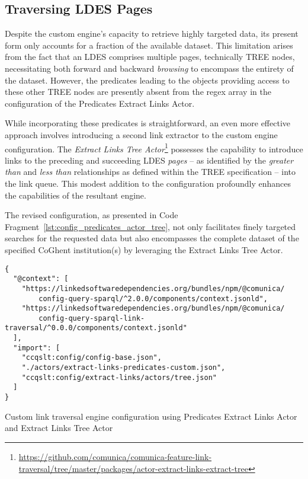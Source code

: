 \subsection{Traversing LDES Pages}

Despite the custom engine's capacity to retrieve highly targeted data, its present form only accounts for a fraction of the available dataset. This limitation arises from the fact that an LDES comprises multiple pages, technically TREE nodes, necessitating both forward and backward \textit{browsing} to encompass the entirety of the dataset. However, the predicates leading to the objects providing access to these other TREE nodes are presently absent from the regex array in the configuration of the Predicates Extract Links Actor.

While incorporating these predicates is straightforward, an even more effective approach involves introducing a second link extractor to the custom engine configuration. The \textit{Extract Links Tree Actor}\footnote{\url{https://github.com/comunica/comunica-feature-link-traversal/tree/master/packages/actor-extract-links-extract-tree}} possesses the capability to introduce links to the preceding and succeeding LDES \textit{pages} – as identified by the \textit{greater than} and \textit{less than} relationships as defined within the TREE specification – into the link queue. This modest addition to the configuration profoundly enhances the capabilities of the resultant engine.

The revised configuration, as presented in Code Fragment~\ref{lst:config_predicates_actor_tree}, not only facilitates finely targeted searches for the requested data but also encompasses the complete dataset of the specified CoGhent institution(s) by leveraging the Extract Links Tree Actor.

\begin{listing}[htbp]
    \begin{verbatim}
{
  "@context": [
    "https://linkedsoftwaredependencies.org/bundles/npm/@comunica/
        config-query-sparql/^2.0.0/components/context.jsonld",
    "https://linkedsoftwaredependencies.org/bundles/npm/@comunica/
        config-query-sparql-link-traversal/^0.0.0/components/context.jsonld"
  ],
  "import": [
    "ccqslt:config/config-base.json",
    "./actors/extract-links-predicates-custom.json",
    "ccqslt:config/extract-links/actors/tree.json"
  ]
}
    \end{verbatim}
    \caption{Custom link traversal engine configuration using Predicates Extract Links Actor and Extract Links Tree Actor}
    \label{lst:config_predicates_actor_tree}
\end{listing}

